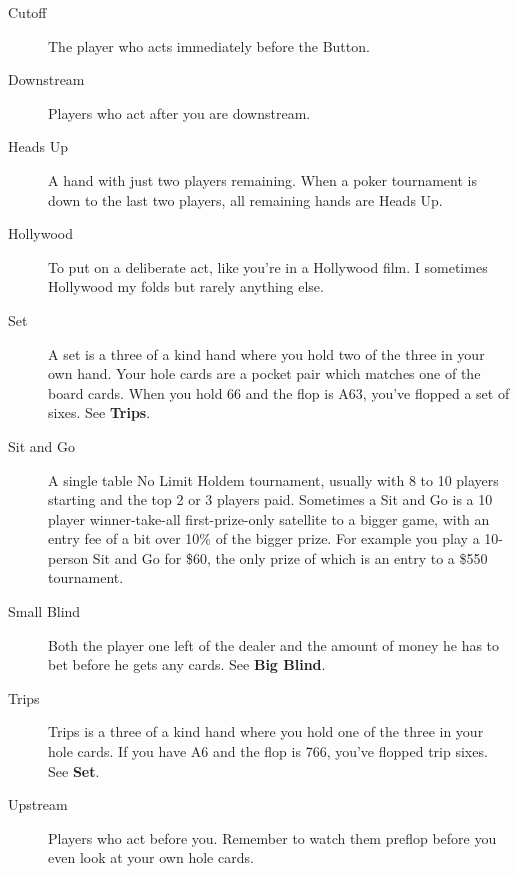 \begin{description}
\item[Cutoff] The player who acts immediately before the Button.

\item[Downstream] Players who act after you are downstream.

\item[Heads Up] A hand with just two players remaining. When a poker tournament
is down to the last two players, all remaining hands are Heads Up.

\item[Hollywood] To put on a deliberate act, like you're in a Hollywood film. I
sometimes Hollywood my folds but rarely anything else.

\item[Set] A set is a three of a kind hand where you hold two of the three in your
own hand. Your hole cards are a pocket pair which matches one of the board cards.
When you hold 66 and the flop is A63, you've flopped a set of sixes. See \textbf{Trips}.

\item[Sit and Go] A single table No Limit Holdem tournament, usually with 8 to 10
players starting and the top 2 or 3 players paid. Sometimes a Sit and Go is
a 10 player winner-take-all first-prize-only satellite to a bigger game,
with an entry fee of a bit over 10\% of the bigger prize. For
example you play a 10-person Sit and Go for \$60, the only prize of which
is an entry to a \$550 tournament.

\item[Small Blind] Both the player one left of the dealer and the amount of money he
has to bet before he gets any cards. See \textbf{Big Blind}.

\item[Trips] Trips is a three of a kind hand where you hold one of the three in your
hole cards. If you have A6 and the flop is 766, you've flopped trip sixes. See \textbf{Set}.

\item[Upstream] Players who act before you. Remember to watch them preflop before
you even look at your own hole cards.

\end{description}
